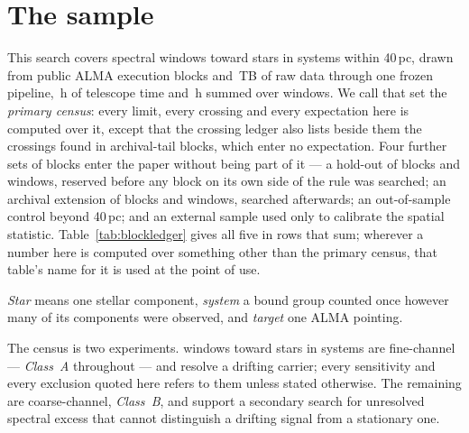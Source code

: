 \section{The sample}
\label{sec:sample}

This search covers \NWindows{} spectral windows toward \NStars{}
stars in \NSystems{} systems within 40\,pc, drawn from \NEB{}
public ALMA execution blocks and \TotalDataTB\,TB of raw data through one
frozen pipeline, \StTelHours\,h of telescope time and \LdgCensusHours\,h
summed over windows. We call that set the
\emph{primary census}: every limit, every crossing and every expectation here
is computed over it, except that the crossing ledger also lists beside them
the \CeNTailCross{} crossings found in archival-tail blocks, which enter no
expectation. Four further sets of blocks enter the paper without
being part of it --- a hold-out of \LdgHoldEB{} blocks and \LdgHoldWin{}
windows, reserved before any block on its own side of the rule was searched;
an archival extension of \LdgExtEB{} blocks and \LdgExtWin{} windows,
searched afterwards; an out-of-sample control beyond 40\,pc; and an external
sample used only to calibrate the spatial statistic.
Table~\ref{tab:blockledger} gives all five in rows that sum; wherever a
number here is computed over something other than the primary census, that
table's name for it is used at the point of use.

\emph{Star} means one stellar component, \emph{system} a bound group
counted once however many of its components were observed, and \emph{target}
one ALMA pointing.

The census is two experiments. \NWinA{} windows toward
\LdgClassAStars{} stars in \NSysClassA{} systems are fine-channel ---
\emph{Class~A} throughout --- and resolve a drifting carrier; every
sensitivity and every exclusion quoted here refers to them unless stated
otherwise. The remaining \NWinB{} are coarse-channel, \emph{Class~B}, and
support a secondary search for unresolved spectral excess that cannot
distinguish a drifting signal from a stationary one.

